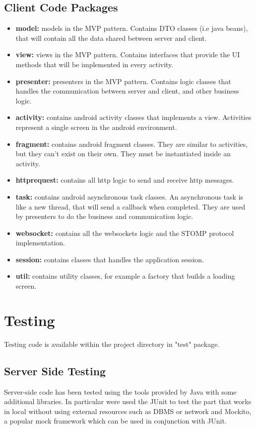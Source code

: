 \documentclass[a4paper]{article}
\begin{document}
\subsection{Client Code Packages}
\begin{itemize}
\item \textbf{model:} models in the MVP pattern. Contains DTO classes (i.e java beans), that will contain all the data shared between server and client.
\item \textbf{view:} views in the MVP pattern. Contains interfaces that provide the UI methods that will be implemented in every activity.
\item \textbf{presenter:} presenters in the MVP pattern. Contains logic classes that handles the communication between server and client, and other business logic.
\item \textbf{activity:} contains android activity classes that implements a view. Activities represent a single screen in the android environment.
\item \textbf{fragment:} contains android fragment classes. They are similar to activities, but they can't exist on their own. They must be instantiated inside an activity.
\item \textbf{httprequest:} contains all http logic to send and receive http messages.
\item \textbf{task:} contains android asynchronous task classes. An asynchronous task is like a new thread, that will send a callback when completed. They are used by presenters to do the business and communication logic.
\item \textbf{websocket:} contains all the websockets logic and the STOMP protocol implementation.
\item \textbf{session:} contains classes that handles the application session.
\item \textbf{util:} contains utility classes, for example a factory that builds a loading screen.
\end{itemize}

\newpage
\section{Testing}
Testing code is available within the project directory in "test" package.

\subsection{Server Side Testing}
Server-side code has been tested using the tools provided by Java with some additional libraries. In particular were used the JUnit to test the part that works in local without using external resources such as DBMS or network and Mockito, a popular mock framework which can be used in conjunction with JUnit.
\end{document}
